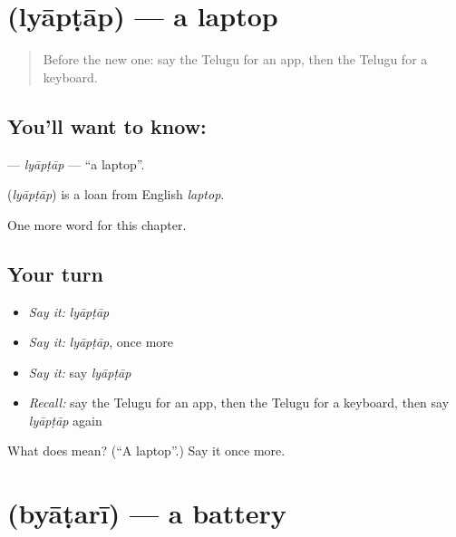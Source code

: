 \section[\texorpdfstring{\te{ల్యాప్టాప్} (lyāpṭāp)}{ల్యాప్టాప్ (lyāpṭāp)}]{ (lyāpṭāp) — a laptop}

\label{lesson:TE-C305-lyaptap}



\begin{quote}
Before the new one: say the Telugu for an app, then the Telugu for a keyboard.
\end{quote}

\subsection*{You'll want to know: }
\textbf{} — \emph{lyāpṭāp} — \textquotedblleft{}a laptop\textquotedblright{}.

\begin{cousinweb}
\textbf{} (\emph{lyāpṭāp}) is a loan from English \emph{laptop}.
\end{cousinweb}

\begin{grammarlens}[title={What you've built}]
One more word for this chapter.
\end{grammarlens}

\subsection*{Your turn}
\begin{itemize}
\raggedright
  \item \emph{Say it:} \emph{lyāpṭāp}
  \item \emph{Say it:} \emph{lyāpṭāp}, once more
  \item \emph{Say it:} say \emph{lyāpṭāp}
  \item \emph{Recall:} say the Telugu for an app, then the Telugu for a keyboard, then say \emph{lyāpṭāp} again
\end{itemize}

\begin{tcolorbox}[breakable,colback=teal!4,colframe=teal!35!black,title={Before you move on}]
What does  mean? (\textquotedblleft{}A laptop\textquotedblright{}.) Say it once more.
\end{tcolorbox}
\section[\texorpdfstring{\te{బ్యాటరీ} (byāṭarī)}{బ్యాటరీ (byāṭarī)}]{ (byāṭarī) — a battery}

